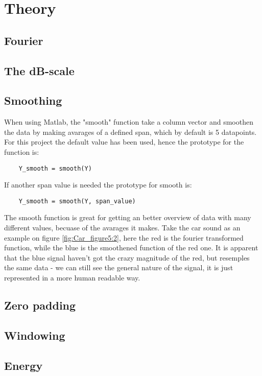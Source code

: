 \section{Theory}

\subsection{Fourier}

\subsection{The dB-scale}

\subsection{Smoothing}

When using Matlab, the "smooth" function take a column vector and smoothen the data by making avarages of a defined span, which by default is 5 datapoints. For this project the default value has been used, hence the prototype for the function is:

\begin{verbatim}
	Y_smooth = smooth(Y)
\end{verbatim}

If another span value is needed the prototype for smooth is:

\begin{verbatim}
	Y_smooth = smooth(Y, span_value)
\end{verbatim}

The smooth function is great for getting an better overview of data with many different values, becuase of the avarages it makes. 
Take the car sound as an example on figure \ref{fig:Car_figure5:2}, here the red is the fourier transformed function, while the blue is the smoothened function of the red one. It is apparent that the blue signal haven't got the crazy magnitude of the red, but resemples the same data - we can still see the general nature of the signal, it is just represented in a more human readable way.

\subsection{Zero padding}

\subsection{Windowing}

\subsection{Energy}